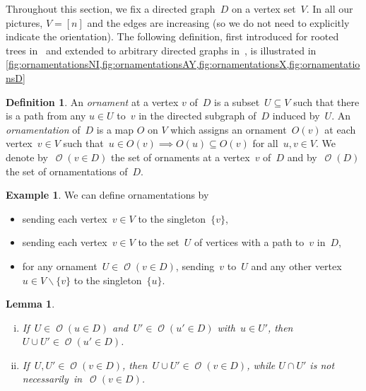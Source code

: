 \documentclass{amsart}
\newtheorem{lemma}[theorem]{Lemma}
\theoremstyle{definition}
\newtheorem{definition}[theorem]{Definition}
\newtheorem{example}[theorem]{Example}
\renewcommand{\c}[1]{\mathcal{#1}} %
\newcommand{\ssm}{\smallsetminus} %
\newcommand{\darkblue}{\color{darkblue}} %
\newcommand{\defn}[1]{\textsl{\darkblue #1}} %
\DeclareMathOperator{\Orn}{\c{O}}  %
\begin{document}
Throughout this section, we fix a directed graph~$D$ on a vertex set~$V$.
In all our pictures, $V = [n]$ and the edges are increasing (so we do not need to explicitly indicate the orientation).
The following definition, first introduced for rooted trees in~\cite{} and extended to arbitrary directed graphs in~\cite{}, is illustrated in \cref{fig:ornamentationsNI,fig:ornamentationsAY,fig:ornamentationsX,fig:ornamentationsD}

\begin{definition}
\label{def:Orn}
An \defn{ornament} at a vertex $v$ of~$D$ is a subset~$U \subseteq V$ such that there is a path from any $u \in U$ to~$v$ in the directed subgraph of~$D$ induced by~$U$.
An \defn{ornamentation} of~$D$ is a map $O$ on $V$ which assigns an ornament~$O(v)$ at each vertex~$v \in V$ such that~$u \in O(v) \implies O(u) \subseteq O(v)$ for all~$u,v \in V$.
We denote by~$\Orn(v \in D)$ the set of ornaments at a vertex~$v$ of~$D$ and by~$\Orn(D)$ the set of ornamentations of~$D$.
\end{definition}

\begin{example}
We can define ornamentations by
\begin{itemize}
\item sending each vertex~$v \in V$ to the singleton~$\{v\}$, 
\item sending each vertex~$v \in V$ to the set~$U$ of vertices with a path to~$v$ in~$D$,
\item for any ornament~$U \in \Orn(v \in D)$, sending~$v$ to~$U$ and any other vertex~$u \in V \ssm \{v\}$ to the singleton~$\{u\}$.
\end{itemize}
\end{example}

\begin{lemma}
\label{lem:unionOrnaments}
\begin{enumerate}[(i)]
\item If~$U \in \Orn(u \in D)$ and~$U' \in \Orn(u' \in D)$ with~$u \in U'$, then~${U \cup U' \in \Orn(u' \in D)}$.
\item If~$U,U' \in \Orn(v \in D)$, then~$U \cup U' \in \Orn(v \in D)$, while $U \cap U'$ is not necessarily~in~${\Orn(v \in D)}$.
\end{enumerate}
\end{lemma}
\end{document}
